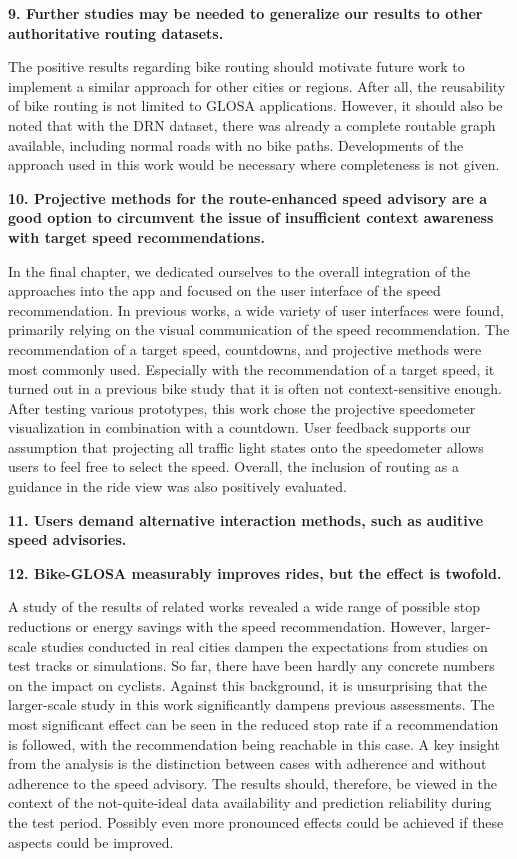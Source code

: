 \textbf{\color{cidarkblue}9. Further studies may be needed to generalize our results to other authoritative routing datasets.} 

The positive results regarding bike routing should motivate future work to implement a similar approach for other cities or regions. After all, the reusability of bike routing is not limited to GLOSA applications. However, it should also be noted that with the DRN dataset, there was already a complete routable graph available, including normal roads with no bike paths. Developments of the approach used in this work would be necessary where completeness is not given.

\textbf{\color{cidarkblue}10. Projective methods for the route-enhanced speed advisory are a good option to circumvent the issue of insufficient context awareness with target speed recommendations.} 

In the final chapter, we dedicated ourselves to the overall integration of the approaches into the app and focused on the user interface of the speed recommendation. In previous works, a wide variety of user interfaces were found, primarily relying on the visual communication of the speed recommendation. The recommendation of a target speed, countdowns, and projective methods were most commonly used. Especially with the recommendation of a target speed, it turned out in a previous bike study that it is often not context-sensitive enough. After testing various prototypes, this work chose the projective speedometer visualization in combination with a countdown. User feedback supports our assumption that projecting all traffic light states onto the speedometer allows users to feel free to select the speed. Overall, the inclusion of routing as a guidance in the ride view was also positively evaluated.

\textbf{\color{cidarkblue}11. Users demand alternative interaction methods, such as auditive speed advisories.} 



\textbf{\color{cidarkblue}12. Bike-GLOSA measurably improves rides, but the effect is twofold.} 

A study of the results of related works revealed a wide range of possible stop reductions or energy savings with the speed recommendation. However, larger-scale studies conducted in real cities dampen the expectations from studies on test tracks or simulations. So far, there have been hardly any concrete numbers on the impact on cyclists. Against this background, it is unsurprising that the larger-scale study in this work significantly dampens previous assessments. The most significant effect can be seen in the reduced stop rate if a recommendation is followed, with the recommendation being reachable in this case. A key insight from the analysis is the distinction between cases with adherence and without adherence to the speed advisory. The results should, therefore, be viewed in the context of the not-quite-ideal data availability and prediction reliability during the test period. Possibly even more pronounced effects could be achieved if these aspects could be improved.

